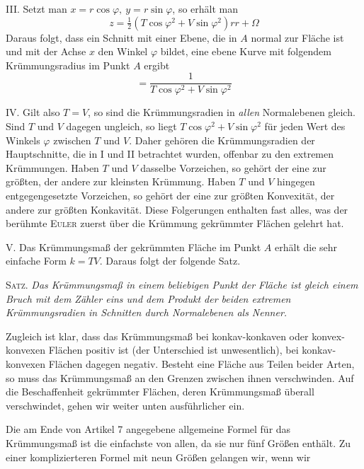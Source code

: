 \par\indent{}%
III. Setzt man \(x=r\cos\varphi,\ y=r\sin\varphi\), so erhält man
\[
z=\tfrac{1}{2}(T\cos\varphi^2+V\sin\varphi^2)rr+\Omega
\]
Daraus folgt, dass ein Schnitt mit einer Ebene, die in \(A\) normal zur Fläche ist und mit der Achse \(x\) den Winkel \(\varphi\) bildet, eine ebene Kurve mit folgendem Krümmungsradius im Punkt \(A\) ergibt
\[
=\frac{1}{T\cos\varphi^2+V\sin\varphi^2}
\]
\par\indent IV. Gilt also \(T=V\), so sind die Krümmungsradien in \textit{allen} Normalebenen gleich. Sind \(T\) und \(V\) dagegen ungleich, so liegt \(T\cos\varphi^2+V\sin\varphi^2\) für jeden Wert des Winkels \(\varphi\) zwischen \(T\) und \(V\). Daher gehören die Krümmungsradien der Hauptschnitte, die in I und II betrachtet wurden, offenbar zu den extremen Krümmungen. Haben \(T\) und \(V\) dasselbe Vorzeichen, so gehört der eine zur größten, der andere zur kleinsten Krümmung. Haben \(T\) und \(V\) hingegen entgegengesetzte Vorzeichen, so gehört der eine zur größten Konvexität, der andere zur größten Konkavität. Diese Folgerungen enthalten fast alles, was der berühmte \textsc{Euler} zuerst über die Krümmung gekrümmter Flächen gelehrt hat.

V. Das Krümmungsmaß der gekrümmten Fläche im Punkt \(A\) erhält die sehr einfache Form \(k=TV\). Daraus folgt der folgende Satz.

\textsc{Satz.} \textit{Das Krümmungsmaß in einem beliebigen Punkt der Fläche ist gleich einem Bruch mit dem Zähler eins und dem Produkt der beiden extremen Krümmungsradien in Schnitten durch Normalebenen als Nenner.}

Zugleich ist klar, dass das Krümmungsmaß bei konkav-konkaven oder konvex-konvexen Flächen positiv ist (der Unterschied ist unwesentlich), bei konkav-konvexen Flächen dagegen negativ. Besteht eine Fläche aus Teilen beider Arten, so muss das Krümmungsmaß an den Grenzen zwischen ihnen verschwinden. Auf die Beschaffenheit gekrümmter Flächen, deren Krümmungsmaß überall verschwindet, gehen wir weiter unten ausführlicher ein.

Die am Ende von Artikel 7 angegebene allgemeine Formel für das Krümmungsmaß ist die einfachste von allen, da sie nur fünf Größen enthält. Zu einer komplizierteren Formel mit neun Größen gelangen wir, wenn wir
